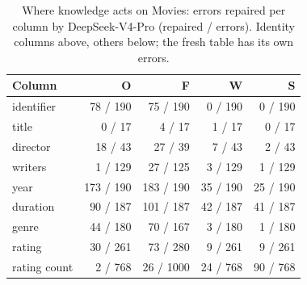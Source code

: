 \begin{table}[t]
  \caption{Where knowledge acts on Movies: errors repaired per column by DeepSeek-V4-Pro (repaired / errors). Identity
  columns above, others below; the fresh table has its own errors.}
  \label{tab:moviescols}
  \small
  \setlength{\tabcolsep}{4pt}
  \begin{tabular}{@{}lrrrr@{}}
    \toprule
    Column & O & F & W & S \\
    \midrule
    identifier & 78 / 190 & 75 / 190 & 0 / 190 & 0 / 190 \\
    title & 0 / 17 & 4 / 17 & 1 / 17 & 0 / 17 \\
    director & 18 / 43 & 27 / 39 & 7 / 43 & 2 / 43 \\
    writers & 1 / 129 & 27 / 125 & 3 / 129 & 1 / 129 \\
    \midrule
    year & 173 / 190 & 183 / 190 & 35 / 190 & 25 / 190 \\
    duration & 90 / 187 & 101 / 187 & 42 / 187 & 41 / 187 \\
    genre & 44 / 180 & 70 / 167 & 3 / 180 & 1 / 180 \\
    rating & 30 / 261 & 73 / 280 & 9 / 261 & 9 / 261 \\
    rating count & 2 / 768 & 26 / 1000 & 24 / 768 & 90 / 768 \\
    \bottomrule
  \end{tabular}
\end{table}
